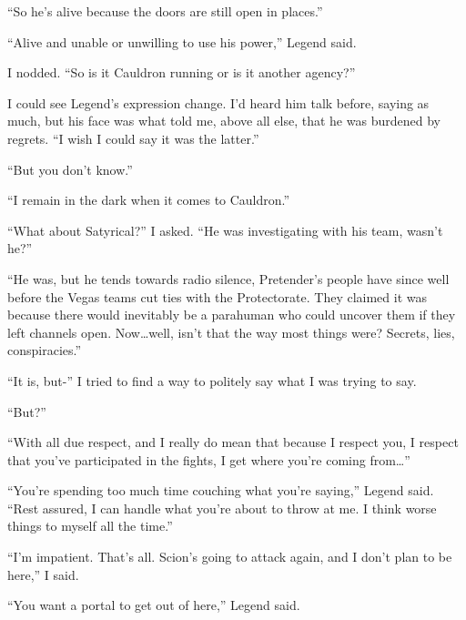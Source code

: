 ``So he's alive because the doors are still open in places.''



``Alive and unable or unwilling to use his power,'' Legend said.



I nodded.  ``So is it Cauldron running or is it another agency?''



I could see Legend's expression change.  I'd heard him talk before, saying as much, but his face was what told me, above all else, that he was burdened by regrets.  ``I wish I could say it was the latter.''



``But you don't know.''



``I remain in the dark when it comes to Cauldron.''



``What about Satyrical?'' I asked.  ``He was investigating with his team, wasn't he?''



``He was, but he tends towards radio silence, Pretender's people have since well before the Vegas teams cut ties with the Protectorate.  They claimed it was because there would inevitably be a parahuman who could uncover them if they left channels open.  Now\ldots well, isn't that the way most things were?  Secrets, lies, conspiracies.''



``It is, but-'' I tried to find a way to politely say what I was trying to say.



``But?''



``With all due respect, and I really do mean that because I respect you, I respect that you've participated in the fights, I get where you're coming from\ldots''



``You're spending too much time couching what you're saying,'' Legend said.  ``Rest assured, I can handle what you're about to throw at me.  I think worse things to myself all the time.''



``I'm impatient.  That's all.  Scion's going to attack again, and I don't plan to be here,'' I said.



``You want a portal to get out of here,'' Legend said.



